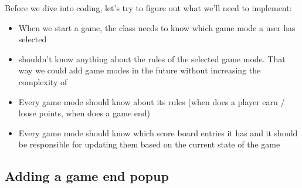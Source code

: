 Before we dive into coding, let's try to figure out what we'll need to
implement:
\begin{itemize}
  \item When we start a game, the  class needs to know
  which game mode a user has selected
  \item {} shouldn't know
  anything about the rules of the selected game mode. That way we could add game
  modes in the future without increasing the complexity of 
  \item Every game mode should know about its rules (when does a player earn /
  loose points, when does a game end)
  \item Every game mode should know which score board entries it has and it
  should be responsible for updating them based on the current state of the game
\end{itemize}
\subsection{Adding a game end popup}

 